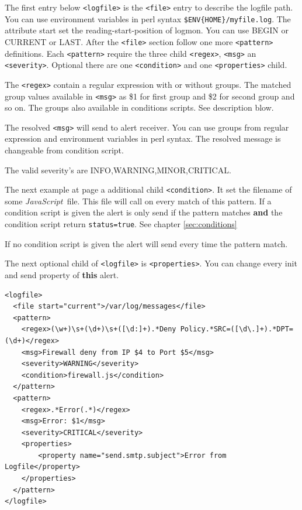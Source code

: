 \documentclass[11pt,a4paper]{article}
\newcommand{\js}{\textit{JavaScript\ }}
\begin{document}
The first entry below \verb#<logfile># is the \verb#<file># entry to describe
the logfile path. You can use environment variables in perl syntax
\verb#$ENV{HOME}/myfile.log#. The attribute start set the reading-start-position
of logmon. You can use BEGIN or CURRENT or LAST.
After the \verb#<file># section
follow one more \verb#<pattern># definitions. Each \verb#<pattern># require the
three child \verb#<regex>#, \verb#<msg># an \verb#<severity>#. Optional there
are one \verb#<condition># and one \verb#<properties># child.

The \verb#<regex># contain a regular expression with or without groups. The
matched group values available in \verb#<msg># as \$1 for first group and \$2
for second group and so on. The groups also available in conditions scripts. See
description blow.

The resolved \verb#<msg># will send to alert receiver. You can use groups from
regular expression and environment variables in perl syntax. The resolved message
is changeable from condition script.

The valid severity's are INFO,WARNING,MINOR,CRITICAL.

The next example at page \pageref{ex:logfile2} a additional child
\verb#<condition>#. It set the filename of some \js file. This file will
call on every match of this pattern. If a condition script is given the alert
is only send if the pattern matches \textbf{and} the condition script return
\verb#status=true#. See chapter \ref{sec:conditions}

If no condition script is given the alert will send every time the pattern
match.

The next optional child of \verb#<logfile># is \verb#<properties>#. You can
change every init and send property of \textbf{this} alert.

\begin{samepage}
\label{ex:logfile2}

\begin{verbatim}
<logfile>
  <file start="current">/var/log/messages</file>
  <pattern>
    <regex>(\w+)\s+(\d+)\s+([\d:]+).*Deny Policy.*SRC=([\d\.]+).*DPT=(\d+)</regex>
    <msg>Firewall deny from IP $4 to Port $5</msg>
    <severity>WARNING</severity>
    <condition>firewall.js</condition>
  </pattern>
  <pattern>
    <regex>.*Error(.*)</regex>
    <msg>Error: $1</msg>
    <severity>CRITICAL</severity>
    <properties>
        <property name="send.smtp.subject">Error from Logfile</property>
    </properties>
  </pattern>
</logfile>
\end{verbatim}
\end{samepage}
\end{document}
